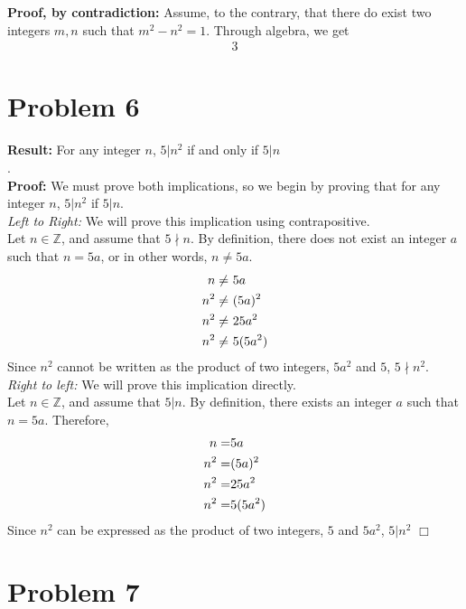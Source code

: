 \documentclass[11pt]{article}
\begin{document}
    \textbf{Proof, by contradiction:} Assume, to the contrary, that there do exist two integers $m, n$ such that $m^2 - n^2 = 1$. Through algebra, we get 
    \begin{align}
        3
    \end{align}

\newpage


\section*{Problem 6}

    \textbf{Result:} For any integer $n$, $5 | n^2$ if and only if $ 5 | n$\\.
    \\
    \textbf{Proof:} We must prove both implications, so we begin by proving that for any integer $n$, $5 | n^2$ if $ 5 | n$. \\
    \textit{Left to Right:} We will prove this implication using contrapositive.\\
    Let $n \in \mathbb{Z}$, and assume that $5 \nmid n $. By definition, there does not exist an integer $a$ such that $n = 5a$, or in other words, $n \neq 5a$.
    \begin{align}
        n \neq& \ 5a \notag \\
        n^2 \neq& \ (5a)^2 \notag \\
        n^2 \neq& \ 25a^2 \notag \\
        n^2 \neq& \ 5(5a^2) \notag
    \end{align}
    Since $n^2$ cannot be written as the product of two integers, $5a^2$ and $5$, $5 \nmid n^2 $. \\
    \textit{Right to left:} We will prove this implication directly.\\
    Let $n \in \mathbb{Z}$, and assume that $5 | n$. By definition, there exists an integer $a$ such that $n = 5a$. Therefore,
    \begin{align}
        n =& 5a \notag\\
        n^2 =& (5a)^2 \notag\\
        n^2 =& 25a^2 \notag\\
        n^2 =& 5(5a^2)
    \end{align}
    Since $n^2$ can be expressed as the product of two integers, $5$ and $5a^2$, $5 | n^2$
    \hfill $\Box$

\newpage



\section*{Problem 7}
\end{document}
